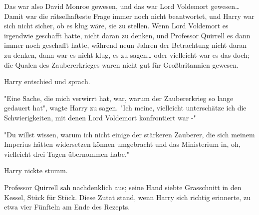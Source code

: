 {Das war also David Monroe gewesen, und das war Lord Voldemort gewesen… Damit war die rätselhafteste Frage immer noch nicht beantwortet, und Harry war sich nicht sicher, ob es klug wäre, sie zu stellen. Wenn Lord Voldemort es irgendwie geschafft hatte, nicht daran zu denken, und Professor Quirrell es dann immer noch geschafft hatte, während neun Jahren der Betrachtung nicht daran zu denken, dann war es nicht klug, es zu sagen… oder vielleicht war es das doch; die Qualen des Zaubererkrieges waren nicht gut für Großbritannien gewesen.

Harry entschied und sprach.

"Eine Sache, die mich verwirrt hat, war, warum der Zaubererkrieg so lange gedauert hat", wagte Harry zu sagen. "Ich meine, vielleicht unterschätze ich die Schwierigkeiten, mit denen Lord Voldemort konfrontiert war -"

"Du willst wissen, warum ich nicht einige der stärkeren Zauberer, die sich meinem Imperius hätten widersetzen können umgebracht und das Ministerium in, oh, vielleicht drei Tagen übernommen habe."

Harry nickte stumm.

Professor Quirrell sah nachdenklich aus; seine Hand siebte Grasschnitt in den Kessel, Stück für Stück. Diese Zutat stand, wenn Harry sich richtig erinnerte, zu etwa vier Fünfteln am Ende des Rezepts.

}

